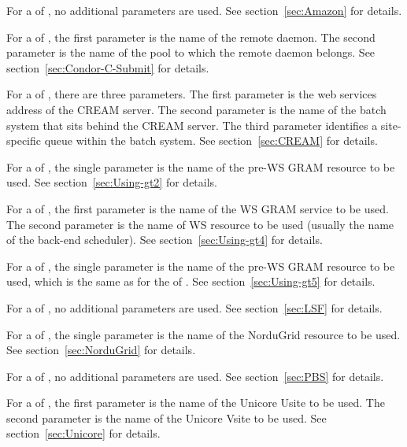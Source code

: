 \begin{description}
For a  of , no additional
parameters are used.
See section~\ref{sec:Amazon} for details.

For a  of ,
the first parameter is the name of the remote 
daemon.
The second parameter is the name of the pool to which the remote
 daemon belongs.
See section~\ref{sec:Condor-C-Submit} for details.

For a  of ,
there are three parameters.
The first parameter is the web services address of the CREAM server.
The second parameter is the 
name of the batch system that sits behind the CREAM server.
The third parameter identifies a site-specific queue
within the batch system.
See section~\ref{sec:CREAM} for details.

For a  of ,
the single parameter is the name of the pre-WS GRAM resource to be used.
See section~\ref{sec:Using-gt2} for details.

For a  of ,
the first parameter is the name of the WS GRAM service to be used.
The second parameter is the name of WS resource to be used (usually the
name of the back-end scheduler).
See section~\ref{sec:Using-gt4} for details.

For a  of ,
the single parameter is the name of the pre-WS GRAM resource to be used,
which is the same as for the  of .
See section~\ref{sec:Using-gt5} for details.

For a  of , no additional
parameters are used.
See section~\ref{sec:LSF} for details.

For a  of ,
the single parameter is the name of the NorduGrid resource to be used.
See section~\ref{sec:NorduGrid} for details.

For a  of , no additional
parameters are used.
See section~\ref{sec:PBS} for details.

For a  of ,
the first parameter is the name of the Unicore Usite to be used.
The second parameter is the name of the Unicore Vsite to be used.
See section~\ref{sec:Unicore} for details.




\end{description}
